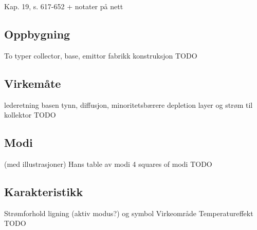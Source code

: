 Kap. 19, s. 617-652
+ notater på nett

\subsection{Oppbygning}
To typer
collector, base, emittor
fabrikk konstruksjon
TODO

\subsection{Virkemåte}
lederetning
basen tynn, diffusjon, minoritetsbærere
depletion layer og strøm til kollektor
TODO

\subsection{Modi}
(med illustrasjoner)
Hans table av modi
4 squares of modi
TODO

\subsection{Karakteristikk}
Strømforhold ligning (aktiv modus?) og symbol
Virkeområde
Temperatureffekt
TODO
